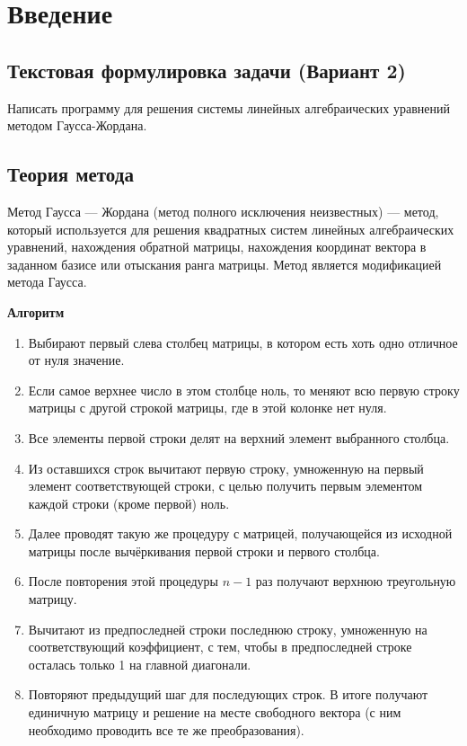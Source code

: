 \documentclass[12pt,a4paper]{scrartcl}
\begin{document}
    \newpage
    
\section{Введение}
    \label{sec:intro}
    \subsection{Текстовая формулировка задачи (Вариант 2)}
	Написать программу для решения системы линейных алгебраических уравнений методом Гаусса-Жордана.
    \subsection{Теория метода}

    Метод Гаусса — Жордана (метод полного исключения неизвестных) — метод, который используется для решения квадратных систем линейных алгебраических уравнений, нахождения обратной матрицы, нахождения координат вектора в заданном базисе или отыскания ранга матрицы. Метод является модификацией метода Гаусса. 
	
\textbf{Алгоритм}	
    \begin{enumerate}
        \item Выбирают первый слева столбец матрицы, в котором есть хоть одно отличное от нуля значение.
        \item Если самое верхнее число в этом столбце ноль, то меняют всю первую строку матрицы с другой строкой матрицы, где в этой колонке нет нуля.
        \item Все элементы первой строки делят на верхний элемент выбранного столбца.
        \item Из оставшихся строк вычитают первую строку, умноженную на первый элемент соответствующей строки, с целью получить первым элементом каждой строки (кроме первой) ноль.
        \item Далее проводят такую же процедуру с матрицей, получающейся из исходной матрицы после вычёркивания первой строки и первого столбца.
        \item После повторения этой процедуры \(n-1\) раз получают верхнюю треугольную матрицу.
        \item Вычитают из предпоследней строки последнюю строку, умноженную на соответствующий коэффициент, с тем, чтобы в предпоследней строке осталась только 1 на главной диагонали.
        \item Повторяют предыдущий шаг для последующих строк. В итоге получают единичную матрицу и решение на месте свободного вектора (с ним необходимо проводить все те же преобразования).
    \end{enumerate}
\end{document}
